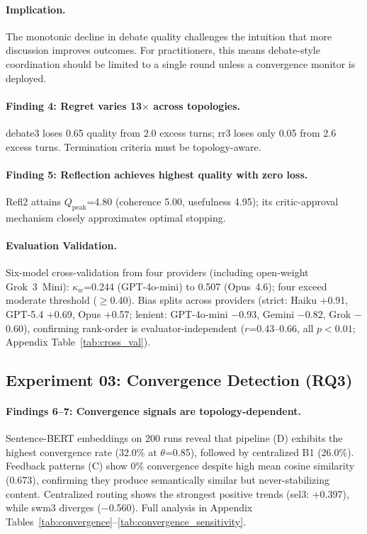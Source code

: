 \documentclass{article}
\begin{document}
\paragraph{Implication.} The monotonic decline in debate quality challenges the intuition that more discussion improves outcomes. For practitioners, this means debate-style coordination should be limited to a single round unless a convergence monitor is deployed.

\paragraph{Finding 4: Regret varies 13$\times$ across topologies.} debate3 loses 0.65 quality from 2.0 excess turns; rr3 loses only 0.05 from 2.6 excess turns. Termination criteria must be topology-aware.

\paragraph{Finding 5: Reflection achieves highest quality with zero loss.} Refl2 attains $Q_{\text{peak}}$=4.80 (coherence 5.00, usefulness 4.95); its critic-approval mechanism closely approximates optimal stopping.

\paragraph{Evaluation Validation.} Six-model cross-validation from four providers (including open-weight Grok~3~Mini): $\kappa_w$=0.244 (GPT-4o-mini) to 0.507 (Opus~4.6); four exceed moderate threshold ($\geq$0.40). Bias splits across providers (strict: Haiku +0.91, GPT-5.4 +0.69, Opus +0.57; lenient: GPT-4o-mini $-$0.93, Gemini $-$0.82, Grok $-$0.60), confirming rank-order is evaluator-independent ($r$=0.43--0.66, all $p<0.01$; Appendix Table~\ref{tab:cross_val}).

\subsection{Experiment 03: Convergence Detection (RQ3)}
\label{sec:exp03}

\paragraph{Findings 6--7: Convergence signals are topology-dependent.} Sentence-BERT embeddings on 200 runs reveal that pipeline (D) exhibits the highest convergence rate (32.0\% at $\theta$=0.85), followed by centralized B1 (26.0\%). Feedback patterns (C) show 0\% convergence despite high mean cosine similarity (0.673), confirming they produce semantically similar but never-stabilizing content. Centralized routing shows the strongest positive trends (sel3: +0.397), while swm3 diverges ($-$0.560). Full analysis in Appendix Tables~\ref{tab:convergence}--\ref{tab:convergence_sensitivity}.
\end{document}
